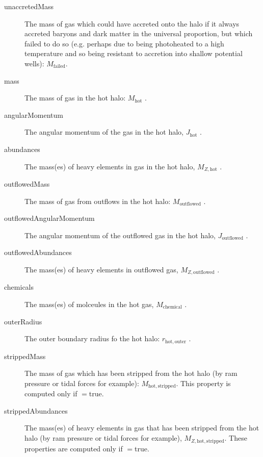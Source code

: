 \begin{description}
 \item [{\normalfont \ttfamily unaccretedMass}] The mass of gas which could have accreted onto the halo if it always accreted baryons and dark matter in the universal proportion, but which failed to do so (e.g. perhaps due to being photoheated to a high temperature and so being resistant to accretion into shallow potential wells): $M_\mathrm{failed}$.
 \item [{\normalfont \ttfamily mass}] The mass of gas in the hot halo: $M_\mathrm{hot}$ {\normalfont \ttfamily [hotHaloMass]}.
 \item [{\normalfont \ttfamily angularMomentum}] The angular momentum of the gas in the hot halo, $J_\mathrm{hot}$ {\normalfont \ttfamily [hotHaloAngularMomentum]}.
 \item [{\normalfont \ttfamily abundances}] The mass(es) of heavy elements in gas in the hot halo, $M_{Z, \mathrm{hot}}$ {\normalfont {}}.
 \item [{\normalfont \ttfamily outflowedMass}] The mass of gas from outflows in the hot halo: $M_\mathrm{outflowed}$ {\normalfont \ttfamily [hotHaloOutflowedMass]}.
 \item [{\normalfont \ttfamily outflowedAngularMomentum}] The angular momentum of the outflowed gas in the hot halo, $J_\mathrm{outflowed}$ {\normalfont \ttfamily [hotHaloOutflowedAngularMomentum]}.
 \item [{\normalfont \ttfamily outflowedAbundances}] The mass(es) of heavy elements in outflowed gas, $M_{Z, \mathrm{outflowed}}$ {\normalfont {}}.
 \item [{\normalfont \ttfamily chemicals}] The mass(es) of molceules in the hot gas, $M_\mathrm{chemical}$ {\normalfont {}}.
 \item [{\normalfont \ttfamily outerRadius}] The outer boundary radius fo the hot halo: $r_\mathrm{hot, outer}$ {\normalfont \ttfamily [hotHaloOuterRadius]}.
 \item [{\normalfont \ttfamily strippedMass}] The mass of gas which has been stripped from the hot halo (by ram pressure or tidal forces for example): $M_\mathrm{hot, stripped}$. This property is computed only if {\normalfont \ttfamily [hotHaloTrackStrippedGas]}$=${\normalfont \ttfamily true}.
 \item [{\normalfont \ttfamily strippedAbundances}] The mass(es) of heavy elements in gas that has been stripped from the hot halo (by ram pressure or tidal forces for example), $M_{Z, \mathrm{hot, stripped}}$. These properties are computed only if {\normalfont \ttfamily [hotHaloTrackStrippedGas]}$=${\normalfont \ttfamily true}.
\end{description}
